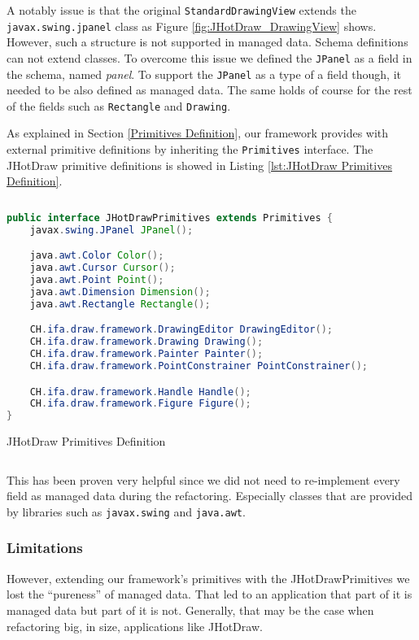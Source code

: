 A notably issue is that the original \texttt{StandardDrawingView} extends the \texttt{javax.swing.jpanel} class as Figure \ref{fig:JHotDraw_DrawingView} shows.
However, such a structure is not supported in managed data. 
Schema definitions can not extend classes.
To overcome this issue we defined the \texttt{JPanel} as a field in the schema, named \textit{panel}.
To support the \texttt{JPanel} as a type of a field though, it needed to be also defined as managed data.
The same holds of course for the rest of the fields such as \texttt{Rectangle} and \texttt{Drawing}.

As explained in Section \ref{Primitives Definition}, our framework provides with external primitive definitions by inheriting the \texttt{Primitives} interface.
The JHotDraw primitive definitions is showed in Listing \ref{lst:JHotDraw Primitives Definition}.

\begin{sourcecode}[H]
	\begin{lstlisting}[language=Java, escapechar=|]
public interface JHotDrawPrimitives extends Primitives {
	javax.swing.JPanel JPanel();

	java.awt.Color Color();
	java.awt.Cursor Cursor();
	java.awt.Point Point();
	java.awt.Dimension Dimension();
	java.awt.Rectangle Rectangle();

	CH.ifa.draw.framework.DrawingEditor DrawingEditor();
	CH.ifa.draw.framework.Drawing Drawing();
	CH.ifa.draw.framework.Painter Painter();
	CH.ifa.draw.framework.PointConstrainer PointConstrainer();

	CH.ifa.draw.framework.Handle Handle();
	CH.ifa.draw.framework.Figure Figure();
}
	\end{lstlisting}
	\caption{JHotDraw Primitives Definition}
	\label{lst:JHotDraw Primitives Definition}
\end{sourcecode}

This has been proven very helpful since we did not need to re-implement every field as managed data during the refactoring. 
Especially classes that are provided by libraries such as \texttt{javax.swing} and \texttt{java.awt}.

\subsubsection{Limitations}
However, extending our framework's primitives with the JHotDrawPrimitives we lost the ``pureness'' of managed data.
That led to an application that part of it is managed data but part of it is not.
Generally, that may be the case when refactoring big, in size, applications like JHotDraw.

